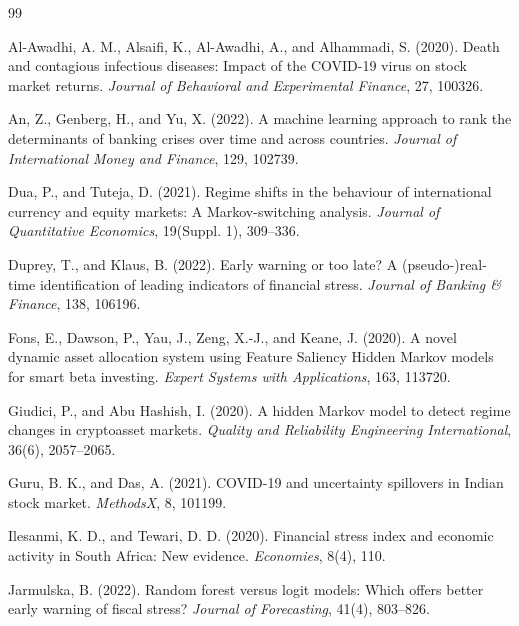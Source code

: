 \documentclass[12pt,a4paper]{article}
\begin{document}
\begin{thebibliography}{99}

Al-Awadhi, A. M., Alsaifi, K., Al-Awadhi, A., and Alhammadi, S. (2020). Death and contagious infectious diseases: Impact of the COVID-19 virus on stock market returns. \textit{Journal of Behavioral and Experimental Finance}, 27, 100326.

An, Z., Genberg, H., and Yu, X. (2022). A machine learning approach to rank the determinants of banking crises over time and across countries. \textit{Journal of International Money and Finance}, 129, 102739.

Dua, P., and Tuteja, D. (2021). Regime shifts in the behaviour of international currency and equity markets: A Markov-switching analysis. \textit{Journal of Quantitative Economics}, 19(Suppl. 1), 309--336.

Duprey, T., and Klaus, B. (2022). Early warning or too late? A (pseudo-)real-time identification of leading indicators of financial stress. \textit{Journal of Banking \& Finance}, 138, 106196.

Fons, E., Dawson, P., Yau, J., Zeng, X.-J., and Keane, J. (2020). A novel dynamic asset allocation system using Feature Saliency Hidden Markov models for smart beta investing. \textit{Expert Systems with Applications}, 163, 113720.

Giudici, P., and Abu Hashish, I. (2020). A hidden Markov model to detect regime changes in cryptoasset markets. \textit{Quality and Reliability Engineering International}, 36(6), 2057--2065.

Guru, B. K., and Das, A. (2021). COVID-19 and uncertainty spillovers in Indian stock market. \textit{MethodsX}, 8, 101199.

Ilesanmi, K. D., and Tewari, D. D. (2020). Financial stress index and economic activity in South Africa: New evidence. \textit{Economies}, 8(4), 110.

Jarmulska, B. (2022). Random forest versus logit models: Which offers better early warning of fiscal stress? \textit{Journal of Forecasting}, 41(4), 803--826.


\end{thebibliography}
\end{document}
